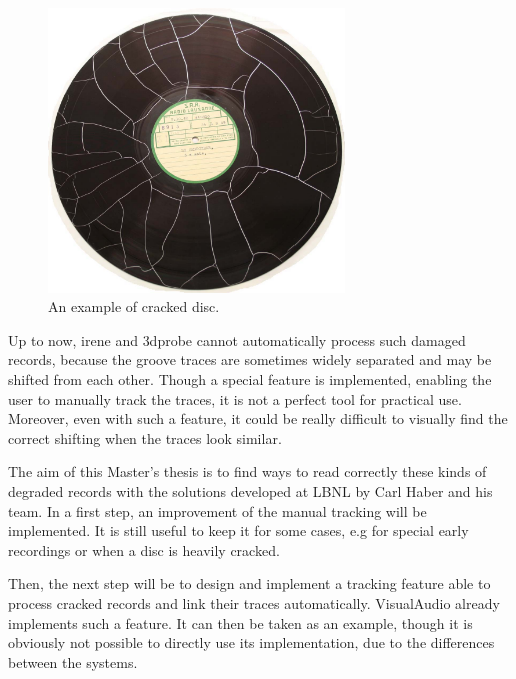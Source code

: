 \begin{figure}[!ht]
\centering
\includegraphics[width=0.7\textwidth]{images/cracked-disc}
\caption{An example of cracked disc.}
\label{fig:crackeddisc}
\end{figure}

Up to now, \gls{irene} and \gls{3dprobe} cannot automatically process such damaged records, because the groove traces are sometimes widely separated and may be shifted from each other. Though a special feature is implemented, enabling the user to manually track the traces, it is not a perfect tool for practical use. Moreover, even with such a feature, it could be really difficult to visually find the correct shifting when the traces look similar.

The aim of this Master's thesis is to find ways to read correctly these kinds of degraded records with the solutions developed at LBNL by Carl Haber and his team. In a first step, an improvement of the manual tracking will be implemented. It is still useful to keep it for some cases, e.g for special early recordings or when a disc is heavily cracked.

Then, the next step will be to design and implement a tracking feature able to process cracked records and link their traces automatically. VisualAudio already implements such a feature. It can then be taken as an example, though it is obviously not possible to directly use its implementation, due to the differences between the systems.


